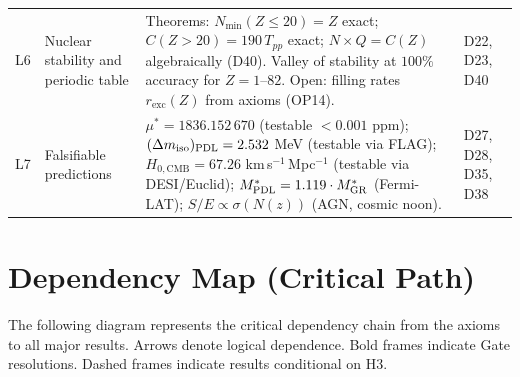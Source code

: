 \documentclass[11pt,a4paper]{article}
\theoremstyle{plain}
\theoremstyle{definition}
\theoremstyle{remark}
\newcommand{\PDL}{\textnormal{PDL}}
\newcommand{\mustar}{\mu^*}
\newcommand{\Tpp}{T_{pp}}
\newcommand{\Nmin}{N_{\min}}
\begin{document}
\begin{longtable}{@{}L{0.6cm}L{3.0cm}L{5.5cm}L{4.0cm}@{}}
L6 & Nuclear stability and periodic table &
\textcolor{proofblue}{Theorems}: $\Nmin(Z\leq20)=Z$ exact; $C(Z>20)=190\,\Tpp$ exact; $N\times Q=C(Z)$ algebraically (D40).
Valley of stability at $100\%$ accuracy for $Z=1$--$82$.
\textcolor{openproblemred}{Open}: filling rates $r_{\mathrm{exc}}(Z)$ from axioms (OP14). &
D22, D23, D40 \\[0.4em]

L7 & Falsifiable predictions &
$\mustar=1836.152\,670$ (testable $<0.001$ ppm);
$(\Delta m_{\mathrm{iso}})_{\PDL}=2.532$ MeV (testable via FLAG);
$H_{0,\mathrm{CMB}}=67.26$ km\,s$^{-1}$\,Mpc$^{-1}$ (testable via DESI/Euclid);
$M^*_{\PDL}=1.119\cdot M^*_{\mathrm{GR}}$ (Fermi-LAT);
$S/E\propto\sigma(N(z))$ (AGN, cosmic noon). &
D27, D28, D35, D38 \\[0.4em]

\end{longtable}

\newpage

\section{Dependency Map (Critical Path)}
\label{sec:dependency}

The following diagram represents the critical dependency chain from the axioms to all major results.
Arrows denote logical dependence.
Bold frames indicate Gate resolutions.
Dashed frames indicate results conditional on H3.
\end{document}
